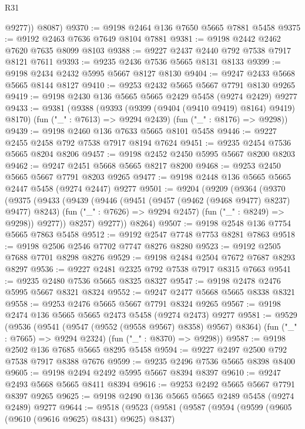 \begin{lexlean}{R31}
\begin{coremodule}
          @9277))
      @8087)
@9370 := @9198 @2464 @136 @7650 @5665 @7881 @5458
@9375 := @9192 @2463 @7636 @7649 @8104 @7881
@9381 := @9198 @2442 @2462 @7620 @7635 @8099 @8103
@9388 := @9227 @2437 @2440 @792 @7538 @7917 @8121 @7611
@9393 := @9235 @2436 @7536 @5665 @8131 @8133
@9399 := @9198 @2434 @2432 @5995 @5667 @8127 @8130
@9404 := @9247 @2433 @5668 @5665 @8144 @8127
@9410 := @9253 @2432 @5665 @5667 @7791 @8130 @9265
@9419 := @9198 @2430 @136 @5665 @5665 @2429 @5458 (@9274 @2429) @9277
@9433 := @9381
    (@9388
      (@9393 (@9399 (@9404 (@9410 @9419) @8164) @9419) @8170)
      (fun ("_" : @7613) => @9294 @2439)
      (fun ("_" : @8176) => @9298))
@9439 := @9198 @2460 @136 @7633 @5665 @8101 @5458
@9446 := @9227 @2455 @2458 @792 @7538 @7917 @8194 @7624
@9451 := @9235 @2454 @7536 @5665 @8204 @8206
@9457 := @9198 @2452 @2450 @5995 @5667 @8200 @8203
@9462 := @9247 @2451 @5668 @5665 @8217 @8200
@9468 := @9253 @2450 @5665 @5667 @7791 @8203 @9265
@9477 := @9198 @2448 @136 @5665 @5665 @2447 @5458 (@9274 @2447) @9277
@9501 := @9204
    (@9209
      (@9364
        (@9370
          (@9375
            (@9433
              (@9439
                (@9446
                  (@9451 (@9457 (@9462 (@9468 @9477) @8237) @9477) @8243)
                  (fun ("_" : @7626) => @9294 @2457)
                  (fun ("_" : @8249) => @9298))
                @9277))
            @8257)
          @9277))
      @8264)
@9507 := @9198 @2548 @136 @7754 @5665 @7863 @5458
@9512 := @9192 @2547 @7748 @7753 @8281 @7863
@9518 := @9198 @2506 @2546 @7702 @7747 @8276 @8280
@9523 := @9192 @2505 @7688 @7701 @8298 @8276
@9529 := @9198 @2484 @2504 @7672 @7687 @8293 @8297
@9536 := @9227 @2481 @2325 @792 @7538 @7917 @8315 @7663
@9541 := @9235 @2480 @7536 @5665 @8325 @8327
@9547 := @9198 @2478 @2476 @5995 @5667 @8321 @8324
@9552 := @9247 @2477 @5668 @5665 @8338 @8321
@9558 := @9253 @2476 @5665 @5667 @7791 @8324 @9265
@9567 := @9198 @2474 @136 @5665 @5665 @2473 @5458 (@9274 @2473) @9277
@9581 := @9529
    (@9536
      (@9541 (@9547 (@9552 (@9558 @9567) @8358) @9567) @8364)
      (fun ("_" : @7665) => @9294 @2324)
      (fun ("_" : @8370) => @9298))
@9587 := @9198 @2502 @136 @7685 @5665 @8295 @5458
@9594 := @9227 @2497 @2500 @792 @7538 @7917 @8388 @7676
@9599 := @9235 @2496 @7536 @5665 @8398 @8400
@9605 := @9198 @2494 @2492 @5995 @5667 @8394 @8397
@9610 := @9247 @2493 @5668 @5665 @8411 @8394
@9616 := @9253 @2492 @5665 @5667 @7791 @8397 @9265
@9625 := @9198 @2490 @136 @5665 @5665 @2489 @5458 (@9274 @2489) @9277
@9644 := @9518
    (@9523
      (@9581
        (@9587
          (@9594
            (@9599 (@9605 (@9610 (@9616 @9625) @8431) @9625) @8437)

\end{coremodule}
\end{lexlean}
